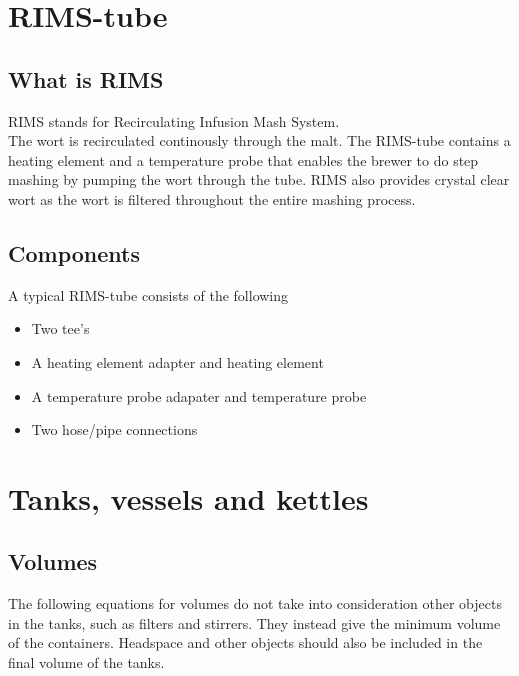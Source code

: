 \documentclass[11pt,fleqn]{book} %
\begin{document}


\chapter{RIMS-tube}

\section{What is RIMS}

RIMS stands for Recirculating Infusion Mash System.\\
The wort is recirculated continously through the malt. The RIMS-tube contains a heating element and a temperature probe that enables the brewer to do step mashing by pumping the wort through the tube. RIMS also provides crystal clear wort as the wort is filtered throughout the entire mashing process.

\section{Components}

A typical RIMS-tube consists of the following

\begin{itemize}
\item Two tee's
\item A heating element adapter and heating element
\item A temperature probe adapater and temperature probe
\item Two hose/pipe connections
\end{itemize}



\chapter{Tanks, vessels and kettles}

\section{Volumes}

The following equations for volumes do not take into consideration other objects in the tanks, such as filters and stirrers. They instead give the minimum volume of the containers. Headspace and other objects should also be included in the final volume of the tanks.
\end{document}
